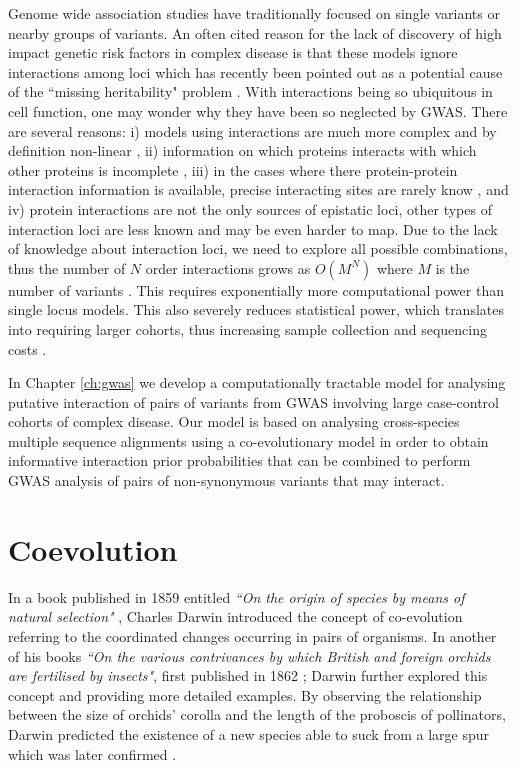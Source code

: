 Genome wide association studies have traditionally focused on single variants or nearby groups of variants. 
An often cited reason for the lack of discovery of high impact genetic risk factors in complex disease is that these models ignore interactions among loci \cite{cordell2009detecting} which has recently been pointed out as a potential cause of the ``missing heritability" problem \cite{zuk2012mystery, zuk2014searching}. 
With interactions being so ubiquitous in cell function, one may wonder why they have been so neglected by GWAS. 
There are several reasons: 
i) models using interactions are much more complex and by definition non-linear \cite{gao2010classification}, 
ii) information on which proteins interacts with which other proteins is incomplete \cite{venkatesan2009empirical},
iii) in the cases where there protein-protein interaction information is available, precise interacting sites are rarely know \cite{venkatesan2009empirical}, and
iv) protein interactions are not the only sources of epistatic loci, other types of interaction loci are less known and may be even harder to map.
Due to the lack of knowledge about interaction loci, we need to explore all possible combinations, thus the number of $N$ order interactions grows as $O(M^N)$ where $M$ is the number of variants \cite{de2013emerging}.
This requires exponentially more computational power than single locus models.
This also severely reduces statistical power, which translates into requiring larger cohorts, thus increasing sample collection and sequencing costs \cite{de2013emerging}.

In Chapter \ref{ch:gwas} we develop a computationally tractable model for analysing putative interaction of pairs of variants from GWAS involving large case-control cohorts of complex disease. 
Our model is based on analysing cross-species multiple sequence alignments using a co-evolutionary model in order to obtain informative interaction prior probabilities that can be combined to perform GWAS analysis of pairs of non-synonymous variants that may interact.
\section{Coevolution}

In a book published in 1859 entitled \textit{``On the origin of species by means of natural selection"} \cite{darwin1859origin}, Charles Darwin introduced the concept of co-evolution referring to the coordinated changes occurring in pairs of organisms.
In another of his books \textit{``On the various contrivances by which British and foreign orchids are fertilised by insects"}, first published in 1862  \cite{darwin1877various}; Darwin further explored this concept and providing more detailed examples.
By observing the relationship between the size of orchids' corolla and the length of the proboscis of pollinators, Darwin predicted the existence of a new species able to suck from a large spur  which was later confirmed \cite{de2013emerging}.

